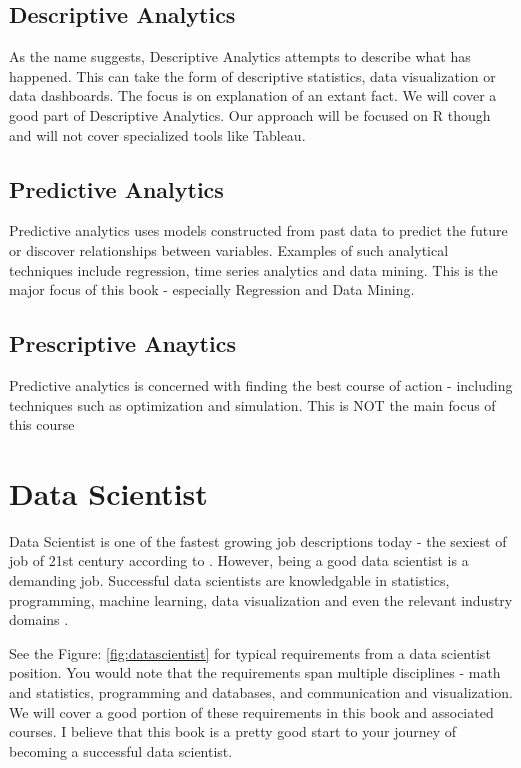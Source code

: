 \documentclass[11pt, letterpaper, twoside]{memoir}\usepackage{knitr}
\begin{document}
\subsection{Descriptive Analytics}

As the name suggests, Descriptive Analytics attempts to describe what has happened. This can take the form of descriptive statistics, data visualization or data dashboards. The focus is on explanation of an extant fact. We will cover a good part of Descriptive Analytics. Our approach will be focused on R though and will not cover specialized tools like Tableau.

\subsection{Predictive Analytics}

Predictive analytics uses models constructed from past data to predict the future or discover relationships between variables. Examples of such analytical techniques include regression, time series analytics and data mining. This is the major focus of this book - especially Regression and Data Mining.

\subsection{Prescriptive Anaytics}

Predictive analytics is concerned with finding the best course of action - including techniques such as optimization and simulation. This is NOT the main focus of this course

\section{Data Scientist}

Data Scientist is one of the fastest growing job descriptions today - the sexiest of job of 21st century according to \citet{patil2012data}.  However, being a good data scientist is a demanding job. Successful data scientists are knowledgable in statistics, programming, machine learning, data visualization and even the relevant industry domains \citep{8SkillsY88:online}.

See the Figure: \ref{fig:datascientist} for typical requirements from a data scientist position. You would note that the requirements span multiple disciplines - math and statistics, programming and databases, and communication and visualization. We will cover a good portion of these requirements in this book and associated courses. I believe that this book is a pretty good start to your journey of becoming a successful data scientist.
\end{document}
